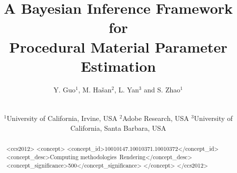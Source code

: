 \documentclass{egpubl}
\title[A Bayesian Inference Framework for Procedural Material Parameter Estimation]%
{A Bayesian Inference Framework for \\ Procedural Material Parameter Estimation\\[-0.5cm]}
\author[Y. Guo, M. Ha\v{s}an, L. Yan \& S. Zhao]
{\parbox{\textwidth}{\centering 
		Y. Guo$^1$\orcid{0000-0002-3420-6619}, 
		M. Ha\v{s}an$^2$\orcid{0000-0003-3808-6092},
		L. Yan$^3$ and 
		S. Zhao$^1$\orcid{0000-0003-4759-0514}
		}
	\\
	{\parbox{\textwidth}{\centering
		$^1$University of California, Irvine, USA \hspace{0.2in}
		$^2$Adobe Research, USA \hspace{0.2in}
		$^3$University of California, Santa Barbara, USA	
		}
	}
}
\begin{document}
 	
	\maketitle
	\begin{abstract}
		
		\begin{CCSXML}
			<ccs2012>
			<concept>
			<concept_id>10010147.10010371.10010372</concept_id>
			<concept_desc>Computing methodologies~Rendering</concept_desc>
			<concept_significance>500</concept_significance>
			</concept>
			</ccs2012>
		\end{CCSXML}
		
	
		\printccsdesc 
	\end{abstract}
	
	
	
	
	
	
	
	
	
\end{document}
